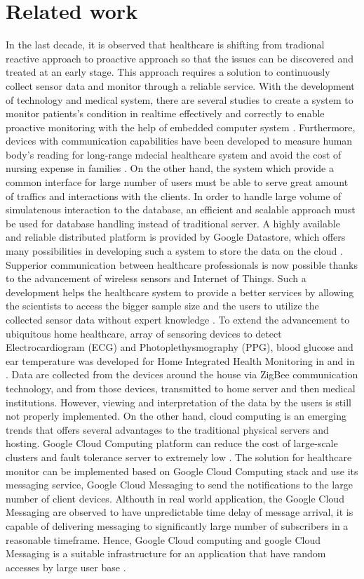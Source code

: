 \section{Related work}
In the last decade, it is observed that healthcare is shifting from tradional reactive approach to proactive approach so
that the issues can be discovered and treated at an early stage. This approach requires a solution to continuously
collect sensor data and monitor through a reliable service.  With the development of technology and medical system,
there are several studies to create a system to monitor patients's condition in realtime effectively and correctly to
enable proactive monitoring \cite{5076774} with the help of embedded computer system \cite{4062461}. Furthermore,
devices with communication capabilities have been developed to measure human body's reading for long-range mdecial
healthcare system and avoid the cost of nursing expense in families \cite{5918041}. On the other hand, the system which
provide a common interface for large number of users must be able to serve great amount of traffics and interactions
with the clients.  In order to handle large volume of simulatenous interaction to the database, an efficient and
scalable approach must be used for database handling instead of traditional server. A highly available and reliable
distributed platform is provided by Google Datastore, which offers many possibilities in developing such a system to
store the data on the cloud \cite{7059154}.  Supperior communication between healthcare professionals is now possible
thanks to the advancement of wireless sensors and Internet of Things. Such a development helps the healthcare system to
provide a better services by allowing the scientists to access the bigger sample size and the users to utilize the
collected sensor data without expert knowledge \cite{7027488}.  To extend the advancement to ubiquitous home
healthcare, array of sensoring devices to detect Electrocardiogram (ECG) and Photoplethysmography (PPG), blood glucose
and ear temperature was developed for Home Integrated Health Monitoring in \cite{4352299} and in \cite{5918041}. Data
are collected from the devices around the house via ZigBee communication technology, and from those devices, transmitted
to home server and then medical institutions. However, viewing and interpretation of the data by the users is still not
properly implemented.  On the other hand, cloud computing is an emerging trends that offers several advantages to the
traditional physical servers and hosting. Google Cloud Computing platform can reduce the cost of large-scale clusters
and fault tolerance server to extremely low \cite{5718338}. The solution for healthcare monitor can be implemented
based on Google Cloud Computing stack and use its messaging service, Google Cloud Messaging to send the notifications to
the large number of client devices. Althouth in real world application, the Google Cloud Messaging are observed to have
unpredictable time delay of message arrival, it is capable of delivering messaging to significantly large number of
subscribers in a reasonable timeframe. Hence, Google Cloud computing and google Cloud Messaging is a suitable
infrastructure for an application that have random accesses by large user base \cite{7037233}.

